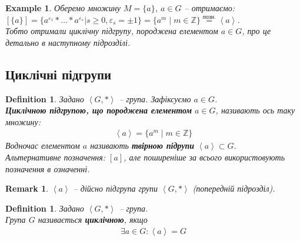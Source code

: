 \documentclass[a4paper, 10pt]{article}
\makeatletter
\theoremstyle{theoremdd}
\theoremstyle{theoremdd}
\newtheorem{definition}[theorem]{Definition}
\theoremstyle{theoremdd}
\theoremstyle{theoremdd}
\theoremstyle{theoremdd}
\newtheorem{example}[theorem]{Example}
\theoremstyle{theoremdd}
\theoremstyle{theoremdd}
\theoremstyle{theoremdd}
\theoremstyle{theoremdd}
\theoremstyle{theoremdd}
\theoremstyle{theoremdd}
\newtheorem{remark}[theorem]{Remark}
\theoremstyle{theoremdd}
\theoremstyle{theoremdd}
\theoremstyle{theoremdd}
\theoremstyle{theoremdd}
\renewenvironment{proof}[1][Proof.\\]{\par
\pushQED{\hfill \qed}%
\normalfont \topsep6\p@\@plus6\p@\relax
\trivlist
\item\relax
{\bfseries
#1\@addpunct{.}}\hspace\labelsep\ignorespaces
}{%
\popQED\endtrivlist\@endpefalse
}
\makeatother
\begin{document}
\begin{example}
Оберемо множину $M = \{a\}$, $a \in G$ -- отримаємо:\\
$[\{a\}] = \{ a^{\varepsilon_1}* \dots * a^{\varepsilon_s} | s \geq 0, \varepsilon_s = \pm 1 \} = \{ a^m \mid m \in \mathbb{Z} \} \overset{\text{позн.}}{=} \left<a\right>$.\\
Тобто отримали циклічну підгрупу, породжена елементом $a \in G$, про це детально в наступному підрозділі.
\end{example}

\subsection{Циклічні підгрупи}
\begin{definition}
Задано $\left<G,* \right>$ -- група. Зафіксуємо $a \in G$.\\
\textbf{Циклічною підгрупою, що породжена елементом} $a \in G$, називають ось таку множину:
\begin{align*}
\left<a\right> = \{ a^m \mid m \in \mathbb{Z} \}
\end{align*}
Водночас елементом $a$ називають \textbf{твірною підрупи} $\left<a\right> \subset G$.\\
Альтернативне позначення: $\left[ a \right]$, але поширеніше за всього використовують позначення в означенні.
\end{definition}

\begin{remark}
$\left<a\right>$ -- дійсно підгрупа групи $\left<G,* \right>$ (попередній підрозділ).
\end{remark}

\iffalse
\begin{proof}
Нехай $x,y \in [a]$, тобто $x = a^m, y = a^n$, де $m,n \in \mathbb{Z}$. Тоді звідси\\
$x*y^{-1} = a^m * (a^n)^{-1} = a^m * a^{-n} = a^{m-n}$, тут в нас $m-n \in \mathbb{Z}$, а тому $x*y^{-1} \in [a]$.
\end{proof}
\fi

\begin{definition}
Задано $\left<G,*\right>$ -- група.\\
Група $G$ називається \textbf{циклічною}, якщо
\begin{align*}
\exists a \in G: \left<a\right> = G
\end{align*}
\end{definition}
\end{document}
